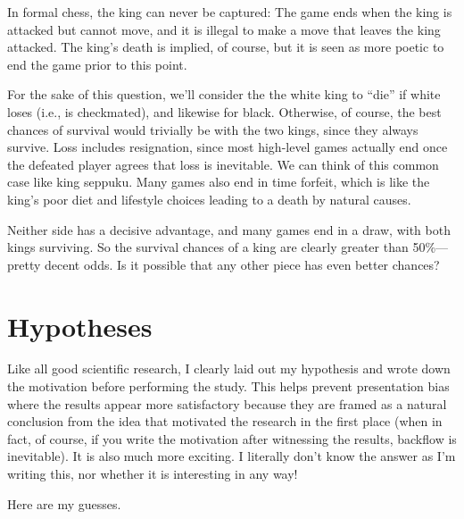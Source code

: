 \documentclass[twocolumn]{article}
\begin{document}
In formal chess, the king can never be captured: The game ends when
the king is attacked but cannot move, and it is illegal to make a move
that leaves the king attacked. The king's death is implied, of course,
but it is seen as more poetic to end the game prior to this point.

For the sake of this question, we'll consider the the white king to
``die'' if white loses (i.e., is checkmated), and likewise for black.
Otherwise, of course, the best chances of survival would trivially be
with the two kings, since they always survive. Loss includes
resignation, since most high-level games actually end once the
defeated player agrees that loss is inevitable. We can think of this
common case like king seppuku. Many games also end in time forfeit,
which is like the king's poor diet and lifestyle choices leading to
a death by natural causes.

Neither side has a decisive advantage, and many games end in a draw,
with both kings surviving. So the survival chances of a king are
clearly greater than 50\%---pretty decent odds. Is it possible that
any other piece has even better chances?

\section{Hypotheses}

Like all good scientific research, I clearly laid out my hypothesis
and wrote down the motivation before performing the study. This helps
prevent presentation bias where the results appear more satisfactory
because they are framed as a natural conclusion from the idea that
motivated the research in the first place (when in fact, of course, if
you write the motivation after witnessing the results, backflow is
inevitable). It is also much more exciting. I literally don't know the
answer as I'm writing this, nor whether it is interesting in any way!

Here are my guesses.
\end{document}
